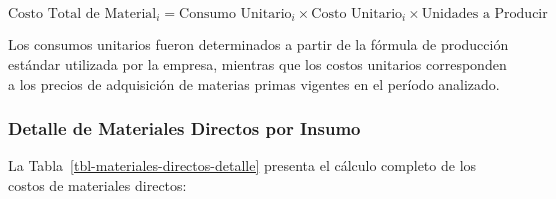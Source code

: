 \documentclass[
  stu,
  floatsintext,
  longtable,
  a4paper,
  nolmodern,
  notxfonts,
  notimes,
  12pt,
  colorlinks=true,linkcolor=blue,citecolor=blue,urlcolor=blue]{apa7}
\begin{document}
\[
\text{Costo Total de Material}_i = \text{Consumo Unitario}_i \times \text{Costo Unitario}_i \times \text{Unidades a Producir}
\]

Los consumos unitarios fueron determinados a partir de la fórmula de
producción estándar utilizada por la empresa, mientras que los costos
unitarios corresponden a los precios de adquisición de materias primas
vigentes en el período analizado.

\subsubsection{Detalle de Materiales Directos por
Insumo}\label{detalle-de-materiales-directos-por-insumo}

La Tabla~\ref{tbl-materiales-directos-detalle} presenta el cálculo
completo de los costos de materiales directos:
\end{document}
